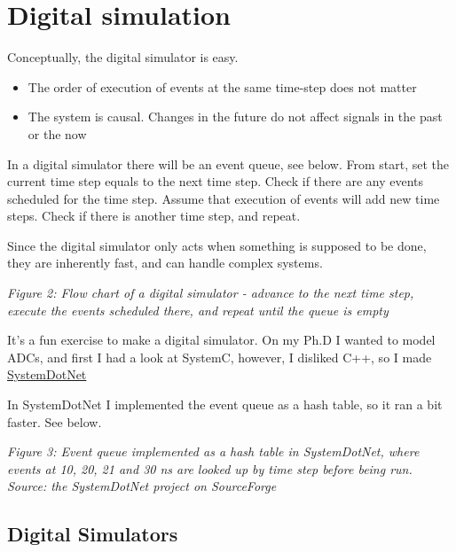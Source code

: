 \section{Digital simulation}\label{digital-simulation}

Conceptually, the digital simulator is easy.

\begin{itemize}
\item
  The order of execution of events at the same time-step does not matter
\item
  The system is causal. Changes in the future do not affect signals in
  the past or the now
\end{itemize}

In a digital simulator there will be an event queue, see below. From
start, set the current time step equals to the next time step. Check if
there are any events scheduled for the time step. Assume that execution
of events will add new time steps. Check if there is another time step,
and repeat.

Since the digital simulator only acts when something is supposed to be
done, they are inherently fast, and can handle complex systems.


{
\centering
{}
}

\emph{Figure 2: Flow chart of a digital simulator - advance to the next
time step, execute the events scheduled there, and repeat until the
queue is empty}

It's a fun exercise to make a digital simulator. On my Ph.D I wanted to
model ADCs, and first I had a look at SystemC, however, I disliked C++,
so I made
\href{https://sourceforge.net/projects/systemdotnet/}{SystemDotNet}

In SystemDotNet I implemented the event queue as a hash table, so it ran
a bit faster. See below.


{
\centering
{}
}

\emph{Figure 3: Event queue implemented as a hash table in SystemDotNet,
where events at 10, 20, 21 and 30 ns are looked up by time step before
being run. Source: the SystemDotNet project on SourceForge}

\subsection{Digital Simulators}\label{digital-simulators}

